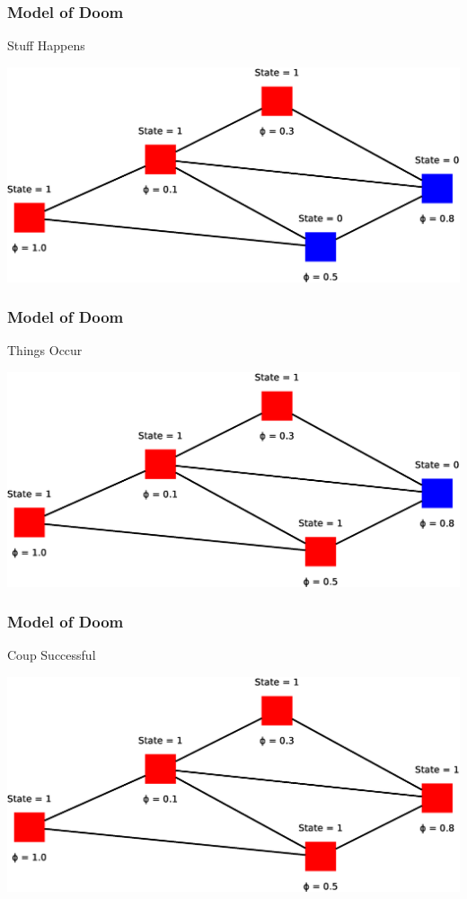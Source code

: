 \begin{frame}
    \frametitle{Model of Doom}
    \begin{itemize}
        \gitem Stuff Happens
    \end{itemize}
    \vspace{8.8pt}
    \includegraphics[width=\textwidth]{img/model7}
    \vfill
\end{frame}

\begin{frame}
    \frametitle{Model of Doom}
    \begin{itemize}
        \gitem Things Occur
    \end{itemize}
    \vspace{8.8pt}
    \includegraphics[width=\textwidth]{img/model8}
    \vfill
\end{frame}

\begin{frame}
    \frametitle{Model of Doom}
    \begin{itemize}
        \gitem Coup Successful
    \end{itemize}
    \vspace{8.8pt}
    \includegraphics[width=\textwidth]{img/model9}
    \vfill
\end{frame}
